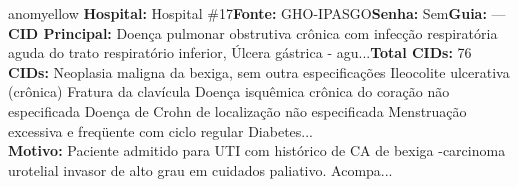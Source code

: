 \documentclass[a4paper,10pt]{article}
\begin{document}
\begin{anomalycard}[Interna\c{c}\~{a}o \#145 | Pac. \#190 | MODERADO (z=2.03) | LOS: 15d | 08/03/2026\,$\to$\,—]{anomyellow}
\textbf{Hospital:} Hospital \#17\quad \textbf{Fonte:} GHO-IPASGO\quad \textbf{Senha:} Sem\quad \textbf{Guia:} ---\\

\textbf{CID Principal:} {\small Doença pulmonar obstrutiva crônica com infecção respiratória aguda do trato respiratório inferior, Úlcera gástrica - agu...}\quad\textbf{Total CIDs:} 76\\

\textbf{CIDs:} {\scriptsize Neoplasia maligna da bexiga, sem outra especificações \textbar{} Ileocolite ulcerativa (crônica) \textbar{} Fratura da clavícula \textbar{} Doença isquêmica crônica do coração não especificada \textbar{} Doença de Crohn de localização não especificada \textbar{} Menstruação excessiva e freqüente com ciclo regular \textbar{} Diabetes...}\\

\textbf{Motivo:} {\scriptsize Paciente admitido para UTI com histórico de CA  de bexiga -carcinoma urotelial invasor de alto grau em cuidados paliativo. Acompa...}\\




\end{anomalycard}
\end{document}
